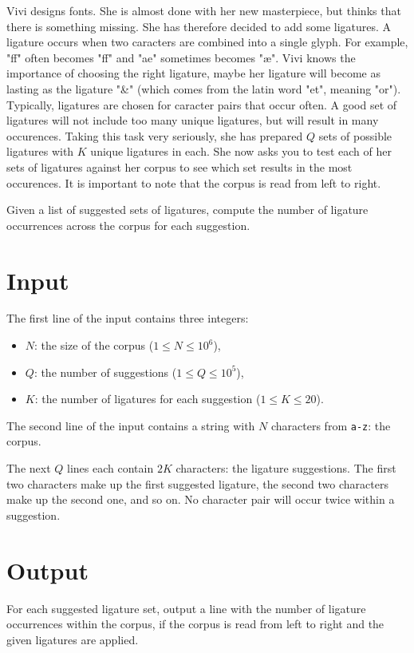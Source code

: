 Vivi designs fonts. She is almost done with her new masterpiece, but thinks that there is something missing. She has therefore decided to add some ligatures. A ligature occurs when two caracters are combined into a single glyph. For example, "ff" often becomes "ﬀ" and "ae" sometimes becomes "æ". Vivi knows the importance of choosing the right ligature, maybe her ligature will become as lasting as the ligature "&" (which comes from the latin word "et", meaning "or"). Typically, ligatures are chosen for caracter pairs that occur often. A good set of ligatures will not include too many unique ligatures, but will result in many occurences. Taking this task very seriously, she has prepared $Q$ sets of possible ligatures with $K$ unique ligatures in each. She now asks you to test each of her sets of ligatures against her corpus to see which set results in the most occurences. It is important to note that the corpus is read from left to right.

Given a list of suggested sets of ligatures, compute the number of ligature occurrences
across the corpus for each suggestion.

\section*{Input}
The first line of the input contains three integers:
\begin{itemize}
  \item $N$: the size of the corpus ($1 \le N \le 10^6$),
  \item $Q$: the number of suggestions ($1 \le Q \le 10^5$),
  \item $K$: the number of ligatures for each suggestion ($1 \le K \le 20$).
\end{itemize}

The second line of the input contains a string with $N$ characters from \texttt{a-z}: the corpus.

The next $Q$ lines each contain $2K$ characters: the ligature suggestions.
The first two characters make up the first suggested ligature, the second two characters make up the second one, and so on.
No character pair will occur twice within a suggestion.

\section*{Output}
For each suggested ligature set, output a line with the number of ligature occurrences within the corpus,
if the corpus is read from left to right and the given ligatures are applied.

